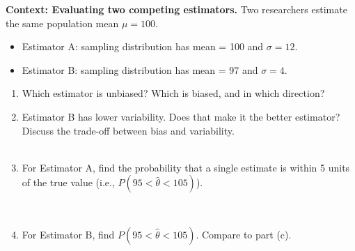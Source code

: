 \documentclass[10pt]{article}
\begin{document}
\begin{tcolorbox}[colback=redbg, colframe=black!40, boxrule=0.6pt, arc=2mm,
    left=3mm, right=3mm, top=2mm, bottom=2mm, title=\textbf{Tier E --- Extension}]
\textbf{Context: Evaluating two competing estimators.}
Two researchers estimate the same population mean $\mu = 100$.
\begin{itemize}
  \item Estimator A: sampling distribution has mean = 100 and $\sigma = 12$.
  \item Estimator B: sampling distribution has mean = 97 and $\sigma = 4$.
\end{itemize}

\begin{enumerate}
  \item Which estimator is unbiased? Which is biased, and in which direction?
        \\
  \item Estimator B has lower variability. Does that make it the better estimator?
        Discuss the trade-off between bias and variability.
        \\
        \\
  \item For Estimator A, find the probability that a single estimate is within 5 units
        of the true value (i.e., $P(95 < \hat{\theta} < 105)$).
        \par\vspace{-\parskip}\nointerlineskip\noindent\begin{minipage}[t][0.8in][t]{\linewidth}\vspace*{2pt}\\
        \end{minipage}
  \item For Estimator B, find $P(95 < \hat{\theta} < 105)$. Compare to part (c).
        \par\vspace{-\parskip}\nointerlineskip\noindent\begin{minipage}[t][0.8in][t]{\linewidth}\vspace*{2pt}\\
        \\
        \end{minipage}
\end{enumerate}
\end{tcolorbox}
\end{document}
